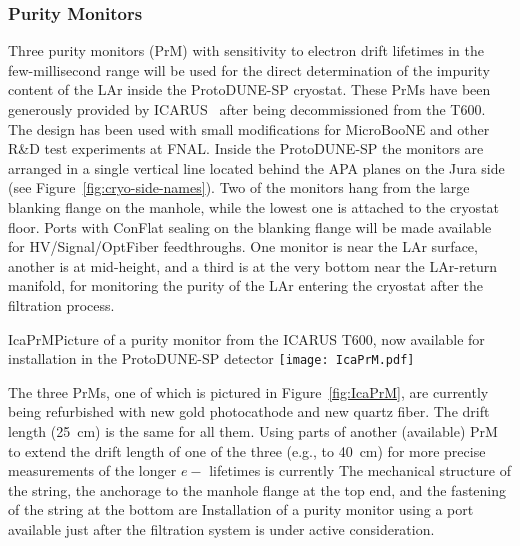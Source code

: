 \subsubsection{Purity Monitors} 
Three purity monitors (PrM) with sensitivity to electron drift lifetimes in the few-millisecond range
 will be used for the direct determination of the impurity content of the LAr inside the ProtoDUNE-SP cryostat. These PrMs have been generously provided by ICARUS~\cite{Amerio:2004ze} %
after being decommissioned from the T600. The design has been used with small modifications for MicroBooNE and other R\&D test experiments at FNAL. Inside the ProtoDUNE-SP the monitors are arranged in a single vertical line located behind the APA planes on the Jura side (see Figure~\ref{fig:cryo-side-names}). Two of the monitors hang from the large blanking flange on the manhole, while the lowest one is attached to the cryostat floor. Ports with ConFlat sealing on the blanking flange will be made available for HV/Signal/OptFiber feedthroughs. One monitor is near the LAr surface, another is at mid-height, and a third is at the very bottom near the LAr-return manifold, %
for monitoring the purity of the LAr entering the cryostat after the filtration process.  

\begin{cdrfigure}{IcaPrM}{Picture of a purity monitor from the ICARUS T600, now available for installation in the ProtoDUNE-SP detector}
\texttt{[image: IcaPrM.pdf]} 
\end{cdrfigure}


The three PrMs, one of which is pictured in Figure~\ref{fig:IcaPrM}, are currently being refurbished with new gold photocathode and new quartz fiber. The drift length  (25~cm) is the same for all them. Using parts of another (available) PrM to extend the drift length of one of the three (e.g., to 40~cm) for more precise measurements of the longer $e-$ lifetimes is currently 
The mechanical structure of the string, the anchorage to the manhole flange at the top end, and the fastening of the string at the bottom %
are 
Installation of a purity monitor using a port available just after the filtration system is under active consideration.  

